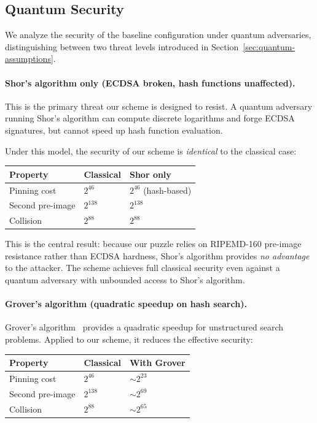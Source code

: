 \documentclass[11pt, a4paper]{article}
\begin{document}
\subsection{Quantum Security}
\label{sec:quantum-security}

We analyze the security of the baseline configuration under quantum adversaries, distinguishing between two threat levels introduced in Section~\ref{sec:quantum-assumptions}.

\paragraph{Shor's algorithm only (ECDSA broken, hash functions unaffected).}
This is the primary threat our scheme is designed to resist. A quantum adversary running Shor's algorithm can compute discrete logarithms and forge ECDSA signatures, but cannot speed up hash function evaluation.

Under this model, the security of our scheme is \emph{identical} to the classical case:

\begin{center}
\begin{tabular}{lll}
\toprule
\textbf{Property} & \textbf{Classical} & \textbf{Shor only} \\
\midrule
Pinning cost & $2^{46}$ & $2^{46}$ (hash-based) \\
Second pre-image & $2^{138}$ & $2^{138}$ \\
Collision & $2^{88}$ & $2^{88}$ \\
\bottomrule
\end{tabular}
\end{center}

\noindent This is the central result: because our puzzle relies on RIPEMD-160 pre-image resistance rather than ECDSA hardness, Shor's algorithm provides \emph{no advantage} to the attacker. The scheme achieves full classical security even against a quantum adversary with unbounded access to Shor's algorithm.

\paragraph{Grover's algorithm (quadratic speedup on hash search).}
Grover's algorithm~\cite{grover1996} provides a quadratic speedup for unstructured search problems. Applied to our scheme, it reduces the effective security:

\begin{center}
\begin{tabular}{lll}
\toprule
\textbf{Property} & \textbf{Classical} & \textbf{With Grover} \\
\midrule
Pinning cost & $2^{46}$ & ${\sim}2^{23}$ \\
Second pre-image & $2^{138}$ & ${\sim}2^{69}$ \\
Collision & $2^{88}$ & ${\sim}2^{65}$ \\
\bottomrule
\end{tabular}
\end{center}
\end{document}
